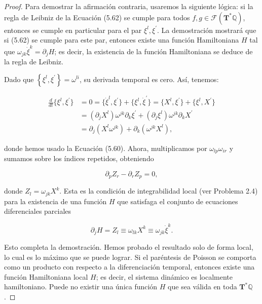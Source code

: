 \begin{proof}
  Para demostrar la afirmación contraria, usaremos la siguiente lógica: si la regla de Leibniz de la Ecuación (5.62) se cumple para todos \( f, g \in \mathcal{F}\left(\mathbf{T}^{*} \mathbb{Q}\right) \), entonces se cumple en particular para el par \( \xi^{l}, \xi^{\prime} \). La demostración mostrará que si (5.62) se cumple para este par, entonces existe una función Hamiltoniana \( H \) tal que \( \omega_{j k} \dot{\xi}^{k} = \partial_{j} H \); es decir, la existencia de la función Hamiltoniana se deduce de la regla de Leibniz.

Dado que \( \left\{\xi^{l}, \xi^{\prime}\right\} = \omega^{l i} \), su derivada temporal es cero. Así, tenemos:

\[
\begin{aligned}
\frac{d}{d t}\{\xi^{l}, \xi^{\prime}\} &= 0 = \{\dot{\xi}^{l}, \xi^{\prime}\} + \{\xi^{l}, \dot{\xi}^{\prime}\} = \{X^{l}, \xi^{\prime}\} + \{\xi^{l}, X^{\prime}\} \\
&= (\partial_{j} X^{l}) \omega^{j k} \partial_{k} \xi^{\prime} + (\partial_{j} \xi^{l}) \omega^{j k} \partial_{k} X^{\prime} \\
&= \partial_{j}(X^{l} \omega^{j k}) + \partial_{k}(\omega^{j k} X^{l}),
\end{aligned}
\]

donde hemos usado la Ecuación (5.60). Ahora, multiplicamos por \( \omega_{l p} \omega_{i r} \) y sumamos sobre los índices repetidos, obteniendo

\[
\partial_{p} Z_{r} - \partial_{r} Z_{p} = 0,
\]

donde \( Z_{l} = \omega_{j k} X^{k} \). Esta es la condición de integrabilidad local (ver Problema 2.4) para la existencia de una función \( H \) que satisfaga el conjunto de ecuaciones diferenciales parciales

\[
\partial_{j} H = Z_{l} \equiv \omega_{l k} X^{k} \equiv \omega_{j k} \dot{\xi}^{k}.
\]

Esto completa la demostración. Hemos probado el resultado solo de forma local, lo cual es lo máximo que se puede lograr. Si el paréntesis de Poisson se comporta como un producto con respecto a la diferenciación temporal, entonces existe una función Hamiltoniana local \( H \); es decir, el sistema dinámico es localmente hamiltoniano. Puede no existir una única función \( H \) que sea válida en toda \( \mathbf{T}^{*} \mathbb{Q} \).
\end{proof}

\begin{corollary}
  
\end{corollary}

